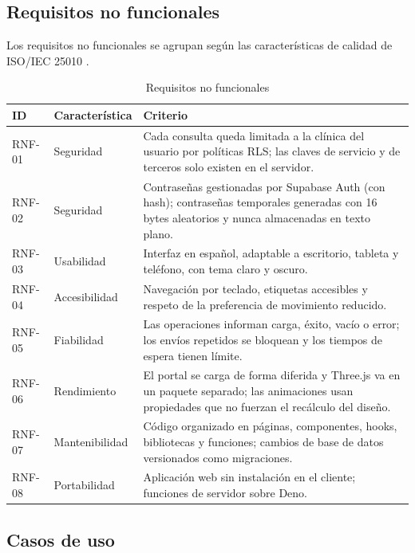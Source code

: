 \documentclass[11pt]{article}
\begin{document}
\subsection{Requisitos no funcionales}

Los requisitos no funcionales se agrupan según las características de calidad de ISO/IEC 25010 \parencite{iso25010}.

\begin{table}[H]
\centering\small
\caption{Requisitos no funcionales}\label{tab:rnf}
\begin{tabularx}{\linewidth}{@{}p{1.3cm}P{3.1cm}L@{}}
\toprule
\textbf{ID} & \textbf{Característica} & \textbf{Criterio} \\
\midrule
RNF-01 & Seguridad & Cada consulta queda limitada a la clínica del usuario por políticas RLS; las claves de servicio y de terceros solo existen en el servidor. \\
RNF-02 & Seguridad & Contraseñas gestionadas por Supabase Auth (con hash); contraseñas temporales generadas con 16 bytes aleatorios y nunca almacenadas en texto plano. \\
RNF-03 & Usabilidad & Interfaz en español, adaptable a escritorio, tableta y teléfono, con tema claro y oscuro. \\
RNF-04 & Accesibilidad & Navegación por teclado, etiquetas accesibles y respeto de la preferencia de movimiento reducido. \\
RNF-05 & Fiabilidad & Las operaciones informan carga, éxito, vacío o error; los envíos repetidos se bloquean y los tiempos de espera tienen límite. \\
RNF-06 & Rendimiento & El portal se carga de forma diferida y Three.js va en un paquete separado; las animaciones usan propiedades que no fuerzan el recálculo del diseño. \\
RNF-07 & Mantenibilidad & Código organizado en páginas, componentes, hooks, bibliotecas y funciones; cambios de base de datos versionados como migraciones. \\
RNF-08 & Portabilidad & Aplicación web sin instalación en el cliente; funciones de servidor sobre Deno. \\
\bottomrule
\end{tabularx}
\end{table}

\subsection{Casos de uso}
\end{document}
